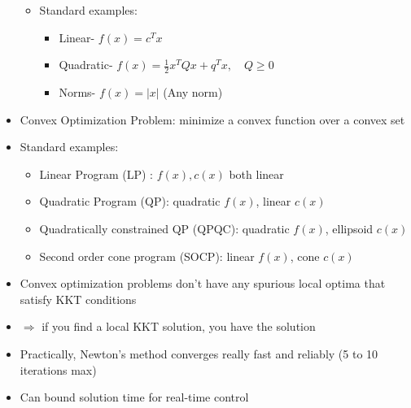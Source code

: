 \documentclass[11pt]{article}
\begin{document}
\begin{itemize}
\begin{itemize}
        \item Standard examples:
        \begin{itemize}
            \item Linear- $f(x) = c^Tx$
            \item Quadratic- $f(x) = \frac{1}{2}x^TQx + q^Tx, \quad Q\geq0$
            \item Norms- $f(x) = |x|$ (Any norm)
        \end{itemize}
    \end{itemize}
    \item Convex Optimization Problem: minimize a convex function over a convex set
    \item Standard examples:
    \begin{itemize}
        \item Linear Program (LP) : $f(x),c(x)$ both linear
        \item Quadratic Program (QP): quadratic $f(x)$, linear $c(x)$
        \item Quadratically constrained QP (QPQC): quadratic $f(x)$, ellipsoid $c(x)$
        \item Second order cone program (SOCP): linear $f(x)$, cone $c(x)$
    \end{itemize}
    \item Convex optimization problems don't have any spurious local optima that satisfy KKT conditions
    \item $\Rightarrow$ if you find a local KKT solution, you have the solution
    \item Practically, Newton's method converges really fast and reliably (5 to 10 iterations max)
    \item Can bound solution time for real-time control
\end{itemize}
\end{document}
